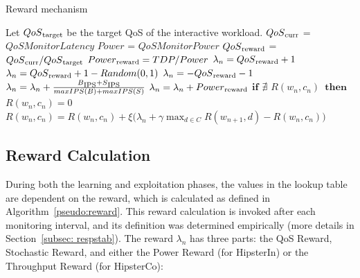 \begin{algorithm}[t]
  \caption{Reward mechanism}
  \label{pseudo:reward}
  \begin{algorithmic}[1]
    \Statex {}
    
    \State Let $QoS\textsubscript{target}$ be the target QoS of the interactive workload.
    \State $QoS\textsubscript{curr}$ = $QoSMonitorLatency$
    \State $Power$ = $QoSMonitorPower$
    \State $QoS\textsubscript{reward}$ = $QoS\textsubscript{curr} / QoS\textsubscript{target} $ 
    \State $Power\textsubscript{reward} = TDP / Power $ 
     \State $\lambda_n = QoS\textsubscript{reward} + 1$
    \State $\lambda_n = QoS\textsubscript{reward} + 1 - Random(0,1)$ 
    \Else
    \State $\lambda_n = -QoS\textsubscript{reward} - 1$
    \EndIf
      \vspace{2mm}
    \State $\lambda_n = \lambda_n + \frac{B\textsubscript{IPS}+S\textsubscript{IPS}}{maxIPS(B) + maxIPS(S)}$
    \Else
	\State $\lambda_n = \lambda_n + Power\textsubscript{reward}$
    \EndIf
    \State \emph{$\mathrm{\mathbf{if}}$ $\nexists$ $R(w_n, c_n)$~$\mathrm{\mathbf{then}}$~$R(w_n, c_n) = 0$}
    \vspace{2mm} 
    \State $R(w_n,c_n) = R(w_n,c_n) + \xi\Big(\lambda_n + \gamma\max_{d\in C}R(w_{n+1},d) - R(w_n,c_n)\Big)$
    
  \end{algorithmic}
\end{algorithm}


\subsection{Reward Calculation}
\label{subsec: rewardcalculation}

During both the learning and exploitation phases, the values in the lookup table are
dependent on the reward, which is calculated as defined in Algorithm~\ref{pseudo:reward}.
This reward calculation is invoked after each monitoring interval, and its definition was
determined empirically (more details in Section~\ref{subsec: respstab}). The reward
$\lambda_n$ has three parts: the QoS Reward, Stochastic Reward, and either the Power
Reward (for HipsterIn) or the Throughput Reward (for HipsterCo):

